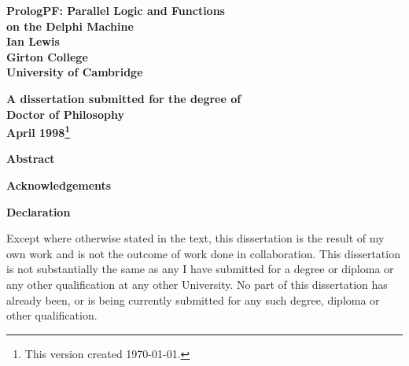 \pagestyle{empty}


{  \begin{center}
\vspace*{\fill}
\LARGE\bf 
PrologPF: Parallel Logic and Functions\\ on the Delphi Machine \\
\vfill
\vfill
\vfill
\Large
 \bf Ian Lewis\\[6mm]
Girton College\\
University of Cambridge\\
\vfill
\centerline{}
\vfill
\large \bf
A dissertation submitted for the degree of\\
Doctor of Philosophy\\[4mm]
April 1998\footnote{This version created \today.}\\
\vspace*{\fill}
\end{center}
}

\newpage
{\bf \Huge Abstract}

\vspace{12pt}





\newpage
\pagestyle{plain}
\vfill 
\vfill
{\bf \Huge Acknowledgements}

\vspace{15pt}




\newpage
{\bf \Huge Declaration}

\vspace{10pt}
Except where otherwise stated in the text, this dissertation is the result of my own work and is not the outcome of work done in collaboration. This dissertation is not substantially the same as any I have submitted for a degree or diploma or any other qualification at any other University. No part of this dissertation has already been, or is being currently submitted for any such degree, diploma or other qualification.





